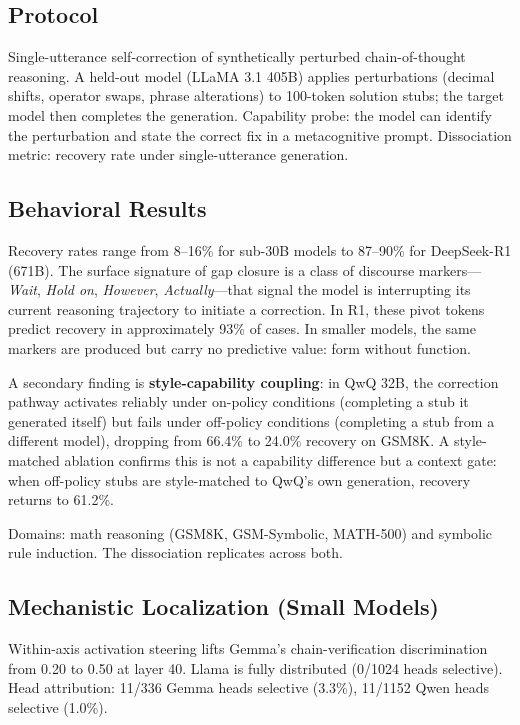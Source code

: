 \documentclass[11pt]{article}
\begin{document}
\subsection{Protocol}

Single-utterance self-correction of synthetically perturbed
chain-of-thought reasoning. A held-out model (LLaMA 3.1 405B) applies
perturbations (decimal shifts, operator swaps, phrase alterations) to
100-token solution stubs; the target model then completes the generation.
Capability probe: the model can identify the perturbation and state the
correct fix in a metacognitive prompt. Dissociation metric: recovery rate
under single-utterance generation.

\subsection{Behavioral Results}

Recovery rates range from 8--16\% for sub-30B models to 87--90\% for
DeepSeek-R1 (671B). The surface signature of gap closure is a class of
discourse markers---\textit{Wait}, \textit{Hold on}, \textit{However},
\textit{Actually}---that signal the model is interrupting its current
reasoning trajectory to initiate a correction. In R1, these pivot tokens
predict recovery in approximately 93\% of cases. In smaller models, the
same markers are produced but carry no predictive value: form without
function.

A secondary finding is \textbf{style-capability coupling}: in QwQ 32B,
the correction pathway activates reliably under on-policy conditions
(completing a stub it generated itself) but fails under off-policy
conditions (completing a stub from a different model), dropping from
66.4\% to 24.0\% recovery on GSM8K. A style-matched ablation confirms
this is not a capability difference but a context gate: when off-policy
stubs are style-matched to QwQ's own generation, recovery returns to
61.2\%.

Domains: math reasoning (GSM8K, GSM-Symbolic, MATH-500) and symbolic
rule induction. The dissociation replicates across both.

\subsection{Mechanistic Localization (Small Models)}

Within-axis activation steering lifts Gemma's chain-verification
discrimination from 0.20 to 0.50 at layer 40. Llama is fully
distributed (0/1024 heads selective). Head attribution: 11/336 Gemma
heads selective (3.3\%), 11/1152 Qwen heads selective (1.0\%).
\end{document}
